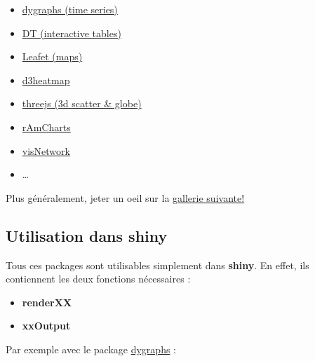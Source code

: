 \documentclass[]{article}
\newenvironment{Shaded}{\begin{snugshade}}{\end{snugshade}}
\newcommand{\KeywordTok}[1]{\textcolor[rgb]{0.13,0.29,0.53}{\textbf{#1}}}
\newcommand{\DataTypeTok}[1]{\textcolor[rgb]{0.13,0.29,0.53}{#1}}
\newcommand{\StringTok}[1]{\textcolor[rgb]{0.31,0.60,0.02}{#1}}
\newcommand{\CommentTok}[1]{\textcolor[rgb]{0.56,0.35,0.01}{\textit{#1}}}
\newcommand{\OperatorTok}[1]{\textcolor[rgb]{0.81,0.36,0.00}{\textbf{#1}}}
\newcommand{\NormalTok}[1]{#1}
\providecommand{\tightlist}{%
  \setlength{\itemsep}{0pt}\setlength{\parskip}{0pt}}
\begin{document}
\begin{itemize}
\tightlist
\item
  \href{http://rstudio.github.io/dygraphs/}{dygraphs (time series)}
\item
  \href{http://rstudio.github.io/DT/}{DT (interactive tables)}
\item
  \href{http://rstudio.github.io/leaflet/}{Leafet (maps)}
\item
  \href{https://github.com/rstudio/d3heatmap}{d3heatmap}
\item
  \href{http://bwlewis.github.io/rthreejs}{threejs (3d scatter \&
  globe)}
\item
  \href{http://datastorm-open.github.io/introduction_ramcharts/}{rAmCharts}
\item
  \href{http://datastorm-open.github.io/visNetwork}{visNetwork}
\item
  \ldots{}
\end{itemize}

Plus généralement, jeter un oeil sur la
\href{http://gallery.htmlwidgets.org/}{gallerie suivante!}

\subsection{Utilisation dans shiny}\label{utilisation-dans-shiny}

Tous ces packages sont utilisables simplement dans \textbf{shiny}. En
effet, ils contiennent les deux fonctions nécessaires :

\begin{itemize}
\tightlist
\item
  \textbf{renderXX}
\item
  \textbf{xxOutput}
\end{itemize}

Par exemple avec le package
\href{http://rstudio.github.io/dygraphs/}{dygraphs} :

\begin{Shaded}
\end{Shaded}
\end{document}
